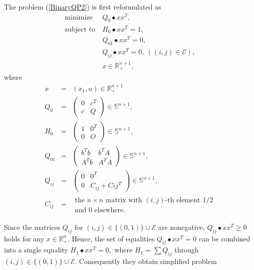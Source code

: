\documentclass[12pt]{book}
\theoremstyle{definition}
\begin{document}
The problem (\ref{BinaryQP2}) is first reformulated as 
\begin{equation}
\label{BinaryQP2ref}
\begin{array}{ll}
\mbox{minimize}&\  Q_0\bullet xx^T ,\\
\mbox{subject to}&\  H_0\bullet xx^T = 1,\\
				 &\  Q_{01}\bullet xx^T = 0,\\
				 &\ Q_{ij}\bullet xx^T = 0, \ ((i,j)\in \mathcal{E}), \\
				 &\ x\in \mathbb{R}^{n+1}_+, 
\end{array}
\end{equation}
where 
\begin{eqnarray}
x &=& (x_1,u)\in\mathbb{R}^{n+1}_+ \\
Q_0 &=& \left(\begin{array}{rr} 0 & c^T \\ c & Q\end{array}\right) \in\mathbb{S}^{n+1},\\
H_0 &=& \left(\begin{array}{rr} 1 & 0^T \\ 0 & O\end{array}\right) \in\mathbb{S}^{n+1}, \\
Q_{01} &=& \left(\begin{array}{rr} b^Tb & b^TA \\ A^Tb & A^TA\end{array}\right) \in\mathbb{S}^{n+1},\\
Q_{ij} &=& \left(\begin{array}{cc} 0 & 0^T \\ 0 & C_{ij} + C{ij}^T\end{array}\right) \in\mathbb{S}^{n+1},\\
C_{ij} &=& \begin{array}{l} \mbox{the } n\times n\mbox{ matrix with } (i,j)\mbox{-th element 1/2}\\ \mbox{and 0 elsewhere.} \end{array}
\end{eqnarray}



Since the matrices $Q_{ij}$ for $(i,j)\in\{(0,1)\}\cup \mathcal{E}$ are nonegative, $Q_{ij}\bullet xx^T\geq 0 $ holds for any $x\in \mathbb{R}^n_+$. Hence, the set of equalities $Q_{ij}\bullet xx^T = 0$ can be combined into a single equality $H_1\bullet xx^T = 0, $ where $H_1 = \sum Q_{ij}$ through $(i,j)\in\{(0,1)\}\cup \mathcal{E}.$
Consequently they obtain simplified problem
\end{document}
